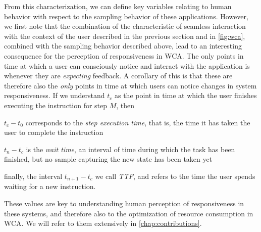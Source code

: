 %
From this characterization, we can define key variables relating to human behavior with respect to the sampling behavior of these applications.
However, we first note that the combination of the characteristic of seamless interaction with the context of the user described in the previous section and in \cref{fig:wca}, combined with the sampling behavior described above, lead to an interesting consequence for the perception of responsiveness in \gls{WCA}.
The only points in time at which a user can consciously notice and interact with the application is whenever they are \emph{expecting} feedback.
A corollary of this is that these are therefore also the \emph{only} points in time at which users can notice changes in system responsiveness.
If we understand \ensuremath{t_c} as the point in time at which the user finishes executing the instruction for step \ensuremath{M}, then
\begin{inlineenum}
    \item \ensuremath{t_c - t_0} corresponds to the \emph{step execution time}, that is, the time it has taken the user to complete the instruction
    \item \ensuremath{t_n - t_c} is the \emph{wait time}, an interval of time during which the task has been finished, but no sample capturing the new state has been taken yet
    \item finally, the interval \ensuremath{t_{n + 1} - t_c} we call \emph{\gls{TTF}}, and refers to the time the user spends waiting for a new instruction.
\end{inlineenum}
These values are key to understanding human perception of responsiveness in these systems, and therefore also to the optimization of resource consumption in \gls{WCA}.
We will refer to them extensively in \cref{chap:contributions}.

